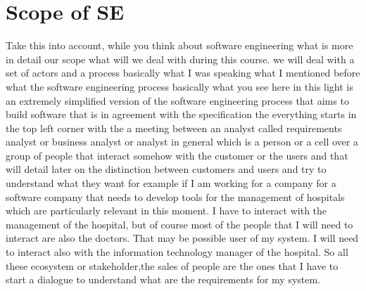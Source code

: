 \documentclass[conference, compsoc, twoside]{IEEEtran}
\begin{document}
\section{Scope of SE} %
Take this into account, while you think about software engineering what is more in detail our scope what will we deal with during this course. 
we will deal with a set of actors and a process basically what I was speaking what I mentioned before what the software engineering process basically what you see here in this light is an extremely simplified version of the software engineering process that aims to build software that is in agreement with the specification the everything starts in the top left corner with the a meeting between an analyst called requirements analyst or business analyst or analyst in general which is a person or a cell over a group of people that interact somehow with the customer or the users and that will detail later on the distinction between customers and users and try to understand what they want 
for example if I am working for a company for a software company that needs to develop tools for the management of hospitals which are particularly relevant in this moment.
I have to interact with the management of the hospital, but of course most of the people that I will need to interact are also the doctors.
That may be possible user of my system. 
I will need to interact also with the information technology manager of the hospital.
So all these ecosystem or stakeholder,the sales of people are the ones that I have to start a dialogue to understand what are the requirements for my system.
\end{document}
